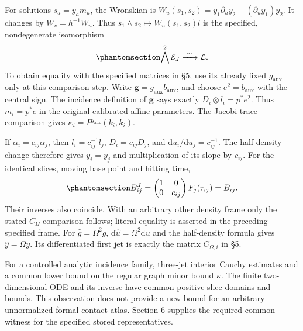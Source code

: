 \documentclass[
  english,
  11pt,
  reqno]{amsart}
\begin{document}
For solutions \(s_a=y_a m_u\), the Wronskian is
\(W_u(s_1,s_2)=y_1\partial_uy_2-(\partial_uy_1)y_2\). It changes by
\(W_v=h^{-1}W_u\). Thus \(s_1\wedge s_2\mapsto W_u(s_1,s_2)l\) is the
specified, nondegenerate isomorphism
\begin{equation}\protect\phantomsection\label{eq:gg-intrinsic-wronskian-line}{
 \bigwedge^2\mathcal E_J\xrightarrow{\ \sim\ }\mathcal L .
}\end{equation} To obtain equality with the specified matrices in §5,
use its already fixed \(g_{\mathrm{aux}}\) only at this comparison step.
Write \(\boldsymbol g=g_{\mathrm{aux}}b_{\mathrm{aux}}\), and choose
\(e^2=b_{\mathrm{aux}}\) with the central sign. The incidence definition
of \(\boldsymbol g\) says exactly \(D_i\otimes l_i=p^*e^2\). Thus
\(m_i=p^*e\) in the original calibrated affine parameters. The Jacobi
trace comparison gives \(\kappa_i=P^{g_{\mathrm{aux}}}(k_i,k_i)\).

If \(\alpha_i=c_{ij}\alpha_j\), then \(l_i=c_{ij}^{-1}l_j\),
\(D_i=c_{ij}D_j\), and \(\mathrm du_i/\mathrm du_j=c_{ij}^{-1}\). The
half-density change therefore gives \(y_i=y_j\) and multiplication of
its slope by \(c_{ij}\). For the identical slices, moving base point and
hitting time,
\begin{equation}\protect\phantomsection\label{eq:gg-intrinsic-literal-optical-matrices}{
 B^J_{ij}=
       \begin{pmatrix}1&0\\0&c_{ij}\end{pmatrix}
                       F_j(\tau_{ij})=B_{ij}.
}\end{equation} Their inverses also coincide. With an arbitrary other
density frame only the stated \(C_\Omega\) comparison follows; literal
equality is asserted in the preceding specified frame. For
\(\widehat g=\Omega^2g\), \(\mathrm d\widehat u=\Omega^2\mathrm du\) and
the half-density formula gives \(\widehat y=\Omega y\). Its
differentiated first jet is exactly the matrix \(C_{\Omega,i}\) in §5.

For a controlled analytic incidence family, three-jet interior Cauchy
estimates and a common lower bound on the regular graph minor bound
\(\kappa\). The finite two-dimensional ODE and its inverse have common
positive slice domains and bounds. This observation does not provide a
new bound for an arbitrary unnormalized formal contact atlas. Section 6
supplies the required common witness for the specified stored
representatives.

\protect{}\label{sec:gg-optical-weighted-resolution}
\end{document}
